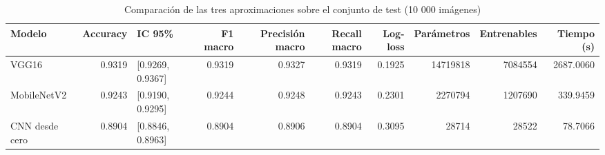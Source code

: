 \begin{table}
\caption{Comparación de las tres aproximaciones sobre el conjunto de test (10 000 imágenes)}
\label{tab:comparativa}
\begin{tabular}{lrlrrrrrrr}
\toprule
Modelo & Accuracy & IC 95\% & F1 macro & Precisión macro & Recall macro & Log-loss & Parámetros & Entrenables & Tiempo (s) \\
\midrule
VGG16 & 0.9319 & [0.9269, 0.9367] & 0.9319 & 0.9327 & 0.9319 & 0.1925 & 14719818 & 7084554 & 2687.0060 \\
MobileNetV2 & 0.9243 & [0.9190, 0.9295] & 0.9244 & 0.9248 & 0.9243 & 0.2301 & 2270794 & 1207690 & 339.9459 \\
CNN desde cero & 0.8904 & [0.8846, 0.8963] & 0.8904 & 0.8906 & 0.8904 & 0.3095 & 28714 & 28522 & 78.7066 \\
\bottomrule
\end{tabular}
\end{table}

